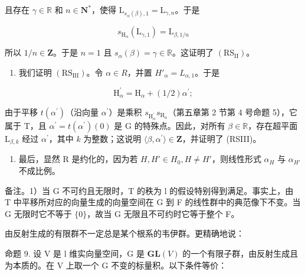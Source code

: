 且存在 \(\gamma \in \mathbb{R}\) 和 \(n\in \mathbf{N}^*\)，使得 \(\mathrm{L}_{s_{\alpha}(\beta),1} = \mathrm{L}_{\gamma ,n}\)。于是

\[
s _ {\mathrm{H} _ {\alpha}} (\mathrm{L} _ {\gamma , 1}) = \mathrm{L} _ {\beta , 1 / n}
\]

所以 \(1 / n\in \mathbf{Z}\)。于是 \(n = 1\) 且 \(s_{\alpha}(\beta) = \gamma \in \mathbb{R}\)。这证明了 \((\mathrm{RS}_{\mathrm{II}})\)。

\begin{enumerate}
\def\labelenumi{\alph{enumi})}
\setcounter{enumi}{2}
\tightlist
\item
  我们证明 \((\mathrm{RS}_{\mathrm{III}})\)。令 \(\alpha \in R\)，并置 \(H'_{\alpha} = L_{\alpha,1}\)。于是
\end{enumerate}

\[
\mathrm{H} _ {\alpha} ^ {\prime} = \mathrm{H} _ {\alpha} + (1 / 2) \alpha^ {\prime};
\]

由于平移 \(t(\alpha^{\prime})\)（沿向量 \(\alpha^{\prime}\)）是乘积 \(s_{\mathrm{H}_{\alpha}^{\prime}}s_{\mathrm{H}_{\alpha}}\)（第五章第 2 节第 4 号命题 5），它属于 T，且 \(\alpha^{\prime} = t(\alpha^{\prime})(0)\) 是 G 的特殊点。因此，对所有 \(\beta \in \mathbb{R}\)，存在超平面 \(\mathrm{L}_{\beta,k}\) 经过 \(\alpha^{\prime}\)，其中 \(k\) 为整数；这说明 \(\langle \beta ,\alpha^{\prime}\rangle \in \mathbf{Z}\)，并证明了 (RSIII)。

\begin{enumerate}
\def\labelenumi{\alph{enumi})}
\setcounter{enumi}{3}
\tightlist
\item
  最后，显然 R 是约化的，因为若 \(H, H' \in H_{0}, H \neq H'\)，则线性形式 \(\alpha_{H}\) 与 \(\alpha_{H'}\) 不成比例。
\end{enumerate}

备注。1）当 G 不可约且无限时，T 的秩为 l 的假设特别得到满足。事实上，由 T 中平移所对应的向量生成的向量空间在 G 到 F 的线性群中的典范像下不变。当 G 无限时它不等于 \(\{0\}\)，故当 G 无限且不可约时它等于整个 F。

由反射生成的有限群不一定总是某个根系的韦伊群。更精确地说：

命题 9. 设 V 是 l 维实向量空间，G 是 \(\mathbf{GL}(V)\) 的一个有限子群，由反射生成且为本质的。在 V 上取一个 G 不变的标量积。以下条件等价：

